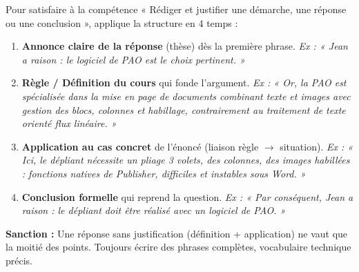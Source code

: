 \documentclass[11pt]{article}
\begin{document}
\begin{methode}
Pour satisfaire à la compétence « Rédiger et justifier une démarche, une réponse ou une conclusion », applique la structure en 4 temps :
\begin{enumerate}
\item \textbf{Annonce claire de la réponse} (thèse) dès la première phrase. \textit{Ex : « Jean a raison : le logiciel de PAO est le choix pertinent. »}
\item \textbf{Règle / Définition du cours} qui fonde l'argument. \textit{Ex : « Or, la PAO est spécialisée dans la mise en page de documents combinant texte et images avec gestion des blocs, colonnes et habillage, contrairement au traitement de texte orienté flux linéaire. »}
\item \textbf{Application au cas concret} de l'énoncé (liaison règle $\rightarrow$ situation). \textit{Ex : « Ici, le dépliant nécessite un pliage 3 volets, des colonnes, des images habillées : fonctions natives de Publisher, difficiles et instables sous Word. »}
\item \textbf{Conclusion formelle} qui reprend la question. \textit{Ex : « Par conséquent, Jean a raison : le dépliant doit être réalisé avec un logiciel de PAO. »}
\end{enumerate}
\textbf{Sanction :} Une réponse sans justification (définition + application) ne vaut que la moitié des points. Toujours écrire des phrases complètes, vocabulaire technique précis.
\end{methode}
\end{document}
